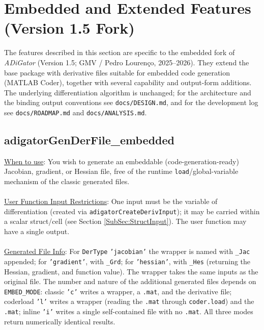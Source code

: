 \documentclass[10pt,pdftex]{article}
\begin{document}
\section{Embedded and Extended Features (Version 1.5 Fork)}\label{Sec:Embedded}
The features described in this section are specific to the embedded fork of \emph{ADiGator} (Version 1.5; GMV / Pedro Louren\c{c}o, 2025--2026). They extend the base package with derivative files suitable for embedded code generation (MATLAB Coder), together with several capability and output-form additions. The underlying differentiation algorithm is unchanged; for the architecture and the binding output conventions see \texttt{docs/DESIGN.md}, and for the development log see \texttt{docs/ROADMAP.md} and \texttt{docs/ANALYSIS.md}.

\subsection{adigatorGenDerFile\_embedded}\label{SubSec:GenDerEmbedded}
\underline{When to use}: You wish to generate an embeddable (code-generation-ready) Jacobian, gradient, or Hessian file, free of the runtime \texttt{load}/global-variable mechanism of the classic generated files.\\\\
\underline{User Function Input Restrictions}: One input must be the variable of differentiation (created via \texttt{adigatorCreateDerivInput}); it may be carried within a scalar struct/cell (see Section \ref{SubSec:StructInput}). The user function may have a single output.\\\\
\underline{Generated File Info}: For \texttt{DerType} \texttt{'jacobian'} the wrapper is named with \texttt{\_Jac} appended; for \texttt{'gradient'}, with \texttt{\_Grd}; for \texttt{'hessian'}, with \texttt{\_Hes} (returning the Hessian, gradient, and function value). The wrapper takes the same inputs as the original file. The number and nature of the additional generated files depends on \texttt{EMBED\_MODE}: classic \texttt{'c'} writes a wrapper, a \texttt{.mat}, and the derivative file; coderload \texttt{'l'} writes a wrapper (reading the \texttt{.mat} through \texttt{coder.load}) and the \texttt{.mat}; inline \texttt{'i'} writes a single self-contained file with no \texttt{.mat}. All three modes return numerically identical results.\\\\
\end{document}
